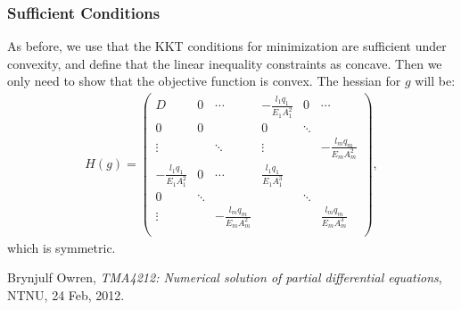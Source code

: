 \documentclass[10pt,a4paper]{article}
\begin{document}
\subsubsection{Sufficient Conditions}
As before, we use that the KKT conditions for minimization are sufficient under convexity, and define that the linear inequality constraints as concave. Then we only need to show that the objective function is convex. 
\newpage
\noindent
The hessian for $g$ will be:
\begin{align}
H(g) = 
\begin{pmatrix}
D & 0 & \cdots & -\frac{l_1 q_1}{E_1 A_1^2} &0 &\cdots \\
0 & 0 &  & 0& \ddots & \\
\vdots &  & \ddots &\vdots  &  & -\frac{l_m q_m}{E_m A_m^2} \\
-\frac{l_1 q_1}{E_1 A_1^2} & 0 & \cdots & \frac{l_1 q_1}{E_1 A_1^3} \\
0 & \ddots& & & \ddots\\
\vdots & & -\frac{l_m q_m}{E_m A_m^2}&& & \frac{l_m q_m}{E_m A_m^3} \\
\end{pmatrix},
\end{align}
which is symmetric.
\begin{thebibliography}{2}
Brynjulf Owren, \emph{TMA4212: Numerical solution of partial differential equations}, NTNU, 24 Feb, 2012.
\end{thebibliography}
\end{document}
